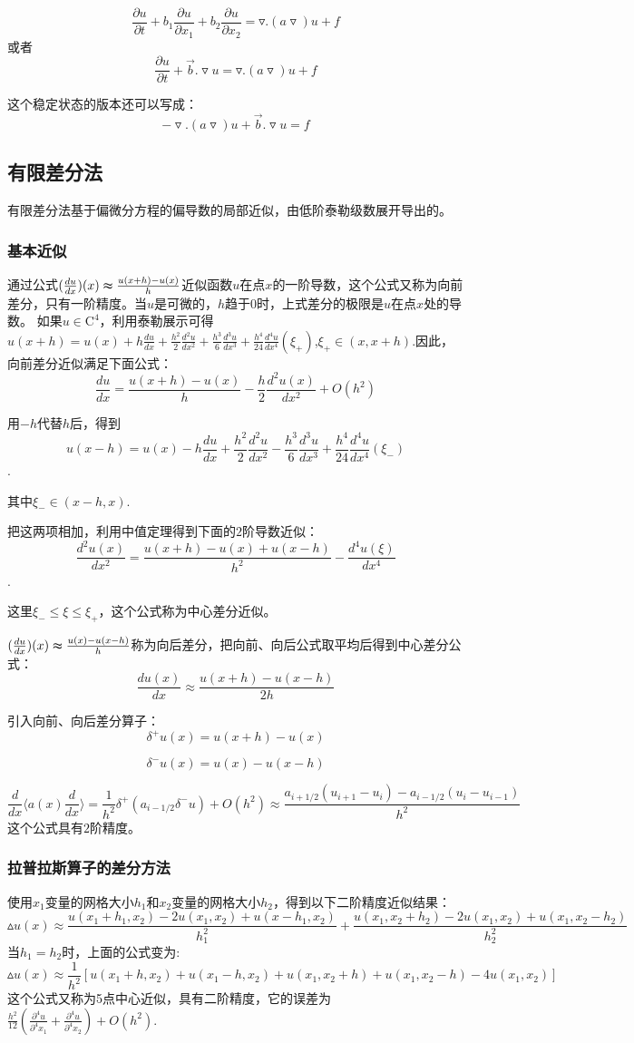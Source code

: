 \documentclass{article}
\begin{document}
$$\dfrac{\partial u}{\partial t}+b_1\dfrac{\partial u}{\partial x_1}+b_2\dfrac{\partial u}{\partial x_2}=\triangledown .(a\triangledown)u+f$$
或者
$$\dfrac{\partial u}{\partial t}+\vec b.\triangledown u=\triangledown .(a\triangledown)u+f$$

这个稳定状态的版本还可以写成：$$-\triangledown .(a\triangledown)u+\vec b.\triangledown u=f$$

\subsection{有限差分法}
有限差分法基于偏微分方程的偏导数的局部近似，由低阶泰勒级数展开导出的。
\subsubsection{基本近似}
通过公式$(\frac{du}{dx})(x)\thickapprox \frac{u(x+h)-u(x)}{h}$近似函数$u$在点$x$的一阶导数，这个公式又称为向前差分，只有一阶精度。当$u$是可微的，$h$趋于$0$时，上式差分的极限是$u$在点$x$处的导数。
如果$u\in \mathrm{C}^4$，利用泰勒展示可得$u(x+h)=u(x)+h\frac{du}{dx}+\frac{h^2}{2}\frac{d^2u}{dx^2}+\frac{h^3}{6}\frac{d^3u}{dx^3}+\frac{h^4}{24}\frac{d^4u}{dx^4}(\xi _+)$,$\xi _+ \in (x,x+h)$.因此，向前差分近似满足下面公式：
$$\frac{du}{dx}=\frac{u(x+h)-u(x)}{h}-\frac{h}{2}\frac{d^2u(x)}{dx^2}+O(h^2)$$

用$-h$代替$h$后，得到
$$u(x-h)=u(x)-h\frac{du}{dx}+\frac{h^2}{2}\frac{d^2u}{dx^2}-\frac{h^3}{6}\frac{d^3u}{dx^3}+\frac{h^4}{24}\frac{d^4u}{dx^4}(\xi _-)$$.

其中$\xi _- \in (x-h,x)$.

把这两项相加，利用中值定理得到下面的$2$阶导数近似：
$$\frac{d^2u(x)}{dx^2}=\frac{u(x+h)-u(x)+u(x-h)}{h^2}-\frac{d^4u(\xi)}{dx^4}$$.

这里$\xi _-\le\xi\le\xi_+$，这个公式称为中心差分近似。

$(\frac{du}{dx})(x)\thickapprox \frac{u(x)-u(x-h)}{h}$称为向后差分，把向前、向后公式取平均后得到中心差分公式：
$$\frac{du(x)}{dx}\approx\frac{u(x+h)-u(x-h)}{2h}$$

引入向前、向后差分算子：
$$\delta ^+ u(x)=u(x+h)-u(x)$$

$$\delta ^- u(x)=u(x)-u(x-h)$$

$$\frac{d}{dx}\langle a(x)\frac{d}{dx}\rangle=\frac{1}{h^2}\delta ^+(a_{i-1/2}\delta ^- u)+O(h^2)\approx\frac{a_{i+1/2}(u_{i+1}-u_i)-a_{i-1/2}(u_{i}-u_{i-1})}{h^2}$$
这个公式具有$2$阶精度。

\subsubsection{拉普拉斯算子的差分方法}
使用$x_1$变量的网格大小$h_1$和$x_2$变量的网格大小$h_2$，得到以下二阶精度近似结果：
$$\vartriangle u(x)\approx\frac{u(x_1+h_1,x_2)-2u(x_1,x_2)+u(x-h_1,x_2)}{h^2 _1}+\frac{u(x_1,x_2+h_2)-2u(x_1,x_2)+u(x_1,x_2-h_2)}{h^2 _2}$$
当$h_1=h_2$时，上面的公式变为:
$$\vartriangle u(x)\approx\frac{1}{h^2}[u(x_1+h,x_2)+u(x_1-h,x_2)+u(x_1,x_2+h)+u(x_1,x_2-h)-4u(x_1,x_2)]$$
这个公式又称为5点中心近似，具有二阶精度，它的误差为$\frac{h^2}{12}(\frac{\partial^4 u}{\partial^4 x_1}+\frac{\partial^4 u}{\partial^4 x_2})+O(h^2)$.
\end{document}
